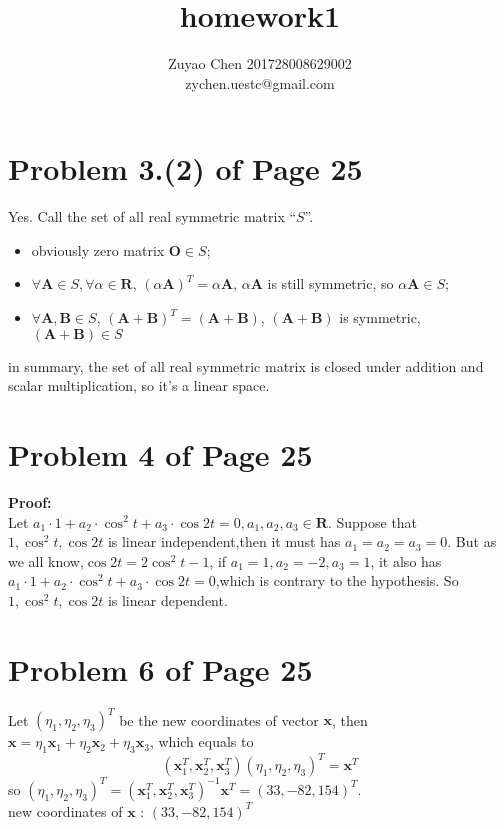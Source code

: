 \documentclass[12pt,a4paper]{article}
\title{homework1}
\author{Zuyao Chen 201728008629002 \\ zychen.uestc@gmail.com}
\date{}
\newcommand{\mysection}[2]{
\section{Problem #1 of Page #2}	
	}
\begin{document}
\maketitle
\mysection{3.(2)}{25}
Yes. 
Call the set of all real symmetric matrix ``${S}$''.
\begin{itemize}
	\item obviously zero matrix $\bm O \in {S}$;
	\item $\forall \bm A \in {S},\forall \alpha \in \mathbf{R}$, 
			$(\alpha \bm{A})^{T} = \alpha \bm{A}$, $\alpha \bm{A}$ is still symmetric,
			so $\alpha \bm{A} \in  {S}$;
	\item $\forall \bm{A} , \bm{B} \in  {S}$, $(\bm{A}+\bm{B})^{T} = (\bm{A}+\bm{B})$,
			$(\bm{A}+\bm{B})$ is symmetric, $(\bm{A}+\bm{B}) \in  {S}$		
\end{itemize}
in summary,	the set of all real symmetric matrix is closed under addition and scalar multiplication, so it's a linear space.
\mysection{4}{25}
\textbf{Proof:} \\
\indent Let
$a_1 \cdot 1 + a_2 \cdot \cos^{2}t + a_3 \cdot \cos 2t = 0,a_1,a_2,a_3 \in \mathbf{R}$.
Suppose that $1, \cos^{2} t, \cos 2t$ is linear independent,then 
it must has $ a_1 = a_2 = a_3 = 0$.
But as we all know,$\cos 2t = 2\cos^{2} t - 1$,
if $a_1 = 1, a_2 = -2 , a_3 = 1$, it also has $a_1 \cdot 1 + a_2 \cdot \cos^{2}t + a_3 \cdot \cos 2t = 0$,which is contrary to the hypothesis.
So $1, \cos^{2} t, \cos 2t$ is linear dependent.

\mysection{6}{25}
Let $(\eta_1,\eta_2,\eta_3)^{T}$ be the new coordinates of vector $\bm{x}$,
then 
$\bm{x}= \eta_1\bm{x}_1 + \eta_2\bm{x}_2+ \eta_3\bm{x}_3 $,
which equals to 
\[
(\bm{x}_1^{T},\bm{x}_2^{T},\bm{x}_3^{T}) (\eta_1,\eta_2,\eta_3)^{T} = \bm{x}^{T}
\]
so $(\eta_1,\eta_2,\eta_3)^{T} 
= (\bm{x}_1^{T},\bm{x}_2^{T},\bm{x}_3^{T})^{-1}\bm{x}^{T} 
= (33,-82,154)^{T}$.\\
new coordinates of $\bm{x}$ : $(33,-82,154)^{T}$
\end{document}
